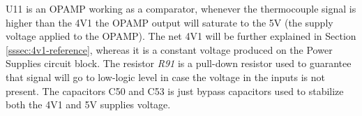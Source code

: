 	U11 is an OPAMP working as a comparator, whenever the thermocouple signal is higher than the 4V1 the OPAMP output will saturate to the 5V (the supply voltage applied to the OPAMP). The net 4V1 will be further explained in Section \ref{sssec:4v1-reference}, whereas it is a constant voltage produced on the Power Supplies circuit block. The resistor \textit{R91} is a pull-down resistor used to guarantee that signal will go to low-logic level in case the voltage in the inputs is not present. The capacitors C50 and C53 is just bypass capacitors used to stabilize both the 4V1 and 5V supplies voltage.